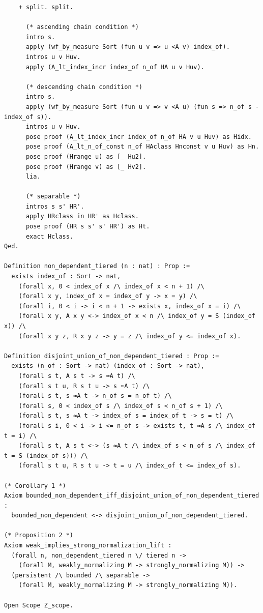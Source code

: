\begin{latin}
\begin{verbatim}
    + split. split.

      (* ascending chain condition *)
      intro s.
      apply (wf_by_measure Sort (fun u v => u <A v) index_of).
      intros u v Huv.
      apply (A_lt_index_incr index_of n_of HA u v Huv).

      (* descending chain condition *)
      intro s.
      apply (wf_by_measure Sort (fun u v => v <A u) (fun s => n_of s - index_of s)).
      intros u v Huv.
      pose proof (A_lt_index_incr index_of n_of HA v u Huv) as Hidx.
      pose proof (A_lt_n_of_const n_of HAclass Hnconst v u Huv) as Hn.
      pose proof (Hrange u) as [_ Hu2].
      pose proof (Hrange v) as [_ Hv2].
      lia.

      (* separable *)
      intros s s' HR'.
      apply HRclass in HR' as Hclass.
      pose proof (HR s s' s' HR') as Ht.
      exact Hclass.
Qed.

Definition non_dependent_tiered (n : nat) : Prop :=
  exists index_of : Sort -> nat,
    (forall x, 0 < index_of x /\ index_of x < n + 1) /\
    (forall x y, index_of x = index_of y -> x = y) /\
    (forall i, 0 < i -> i < n + 1 -> exists x, index_of x = i) /\
    (forall x y, A x y <-> index_of x < n /\ index_of y = S (index_of x)) /\
    (forall x y z, R x y z -> y = z /\ index_of y <= index_of x).

Definition disjoint_union_of_non_dependent_tiered : Prop :=
  exists (n_of : Sort -> nat) (index_of : Sort -> nat),
    (forall s t, A s t -> s ≈A t) /\
    (forall s t u, R s t u -> s ≈A t) /\
    (forall s t, s ≈A t -> n_of s = n_of t) /\
    (forall s, 0 < index_of s /\ index_of s < n_of s + 1) /\
    (forall s t, s ≈A t -> index_of s = index_of t -> s = t) /\
    (forall s i, 0 < i -> i <= n_of s -> exists t, t ≈A s /\ index_of t = i) /\
    (forall s t, A s t <-> (s ≈A t /\ index_of s < n_of s /\ index_of t = S (index_of s))) /\
    (forall s t u, R s t u -> t = u /\ index_of t <= index_of s).

(* Corollary 1 *)
Axiom bounded_non_dependent_iff_disjoint_union_of_non_dependent_tiered :
  bounded_non_dependent <-> disjoint_union_of_non_dependent_tiered.

(* Proposition 2 *)
Axiom weak_implies_strong_normalization_lift :
  (forall n, non_dependent_tiered n \/ tiered n ->
    (forall M, weakly_normalizing M -> strongly_normalizing M)) ->
  (persistent /\ bounded /\ separable ->
    (forall M, weakly_normalizing M -> strongly_normalizing M)).

Open Scope Z_scope.


\end{verbatim}
\end{latin}
